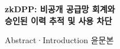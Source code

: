 \documentclass[11pt,a4paper]{article}
\begin{document}
\begin{center}{\Large\bfseries zkDPP: 비공개 공급망 회계와\\승인된 이력 추적 및 사용 차단}\par\smallskip
    {\small Abstract·Introduction 윤문본}
\end{center}

\clearpage

\end{document}
